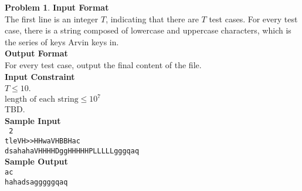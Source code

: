 \documentclass[12pt,a4paper]{report}
\theoremstyle{definition}
\newtheorem{problem}{\textbf{Problem}}
\theoremstyle{definition}
\begin{document}
\begin{problem}
\textbf{\large Input Format}\\
The first line is an integer $T$, indicating that there are $T$ test cases. For every test case, there is a string composed of lowercase and uppercase characters, which is the series of keys Arvin keys in.\\

\textbf{\large Output Format}\\
For every test case, output the final content of the file.\\

\textbf{\large Input Constraint}\\
    $T \leq 10$.\\
    $\text{length of each string}\leq 10^7$\\
    TBD.\\

\textbf{\large Sample Input}\\
\texttt{ 2\\tleVH>>HHwaVHBBHac\\dsahahaVHHHHDggHHHHHPLLLLLgggqaq}\\

\textbf{\large Sample Output}\\
\texttt{ac\\hahadsagggggqaq }\\
\end{problem}
\newpage
\end{document}
